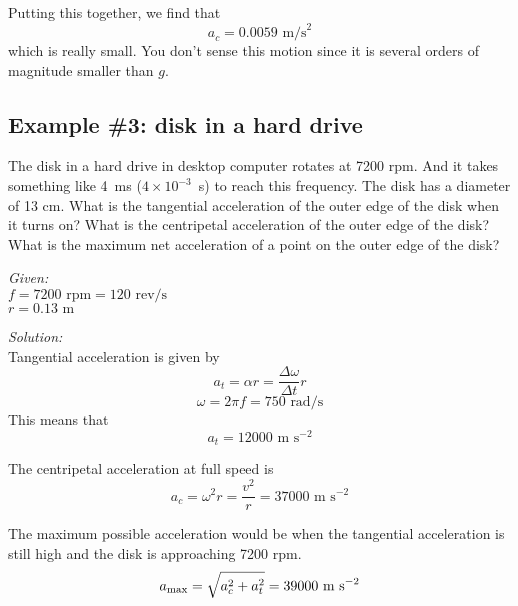 Putting this together, we find that
$$a_c = 0.0059\mbox{ m/s}^2$$
which is really small. You don't sense this motion since it is several orders of magnitude smaller than $g$.


\subsection{Example \#3: disk in a hard drive}
The disk in a hard drive in desktop computer rotates at 7200 rpm. And it takes something like 4~ms ($4\times 10^{-3}$~s) to reach this frequency. The disk has a diameter of 13 cm. What is the tangential acceleration of the outer edge of the disk when it turns on? What is the centripetal acceleration of the outer edge of the disk? What is the maximum net acceleration of a point on the outer edge of the disk?

\textit{Given:}\\
$f=7200\mbox{ rpm}=120\mbox{ rev/s}$\\
$r=0.13\mbox{ m}$

\textit{Solution:}\\
Tangential acceleration is given by
$$a_t = \alpha r = \frac{\Delta \omega}{\Delta t}r$$
$$\omega=2\pi f=750\mbox{ rad/s}$$
This means that
$$a_t = 12000\mbox{ m s}^{-2}$$

The centripetal acceleration at full speed is
$$a_c = \omega^2r = \frac{v^2}{r} = 37000\mbox{ m s}^{-2}$$

The maximum possible acceleration would be when the tangential acceleration is still high and the disk is approaching 7200 rpm.
$$a_{\rm max} = \sqrt{a_c^2+a_t^2} = 39000\mbox{ m s}^{-2}$$






